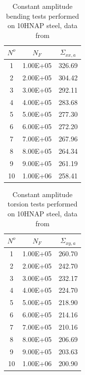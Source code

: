 \begin{table}[!h]
	\centering
	\begin{tabular}{ccc}
		\hline
		$N^o$ & $N_{F}$  & $\Sigma_{xx,a}$ \\ \hline
		1     & 1.00E+05 & 326.69     \\
		2     & 2.00E+05 & 304.42     \\
		3     & 3.00E+05 & 292.11     \\
		4     & 4.00E+05 & 283.68     \\
		5     & 5.00E+05 & 277.30     \\
		6     & 6.00E+05 & 272.20     \\
		7     & 7.00E+05 & 267.96     \\
		8     & 8.00E+05 & 264.34     \\
		9     & 9.00E+05 & 261.19     \\
		10    & 1.00E+06 & 258.41     \\ \hline
	\end{tabular}
	\caption{Constant amplitude bending tests performed on 10HNAP steel, data from \cite{VIDAL1996}}
	\label{tab.10HNAPbending}
\end{table}

\begin{table}[!h]
	\centering
	\begin{tabular}{ccc}
		\hline
		$N^o$ & $N_{F}$  & $\Sigma_{xy,a}$ \\ \hline
		1     & 1.00E+05 & 260.70          \\
		2     & 2.00E+05 & 242.70          \\
		3     & 3.00E+05 & 232.17          \\
		4     & 4.00E+05 & 224.70          \\
		5     & 5.00E+05 & 218.90          \\
		6     & 6.00E+05 & 214.16          \\
		7     & 7.00E+05 & 210.16          \\
		8     & 8.00E+05 & 206.69          \\
		9     & 9.00E+05 & 203.63          \\
		10    & 1.00E+06 & 200.90          \\ \hline
	\end{tabular}
	\caption{Constant amplitude torsion tests performed on 10HNAP steel, data from \cite{VIDAL1996}}
\label{tab.10HNAPtorsion}
\end{table}


